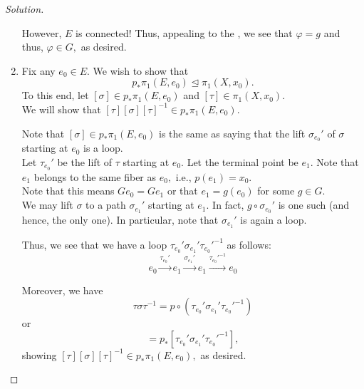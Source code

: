 \documentclass[12pt]{article}
\theoremstyle{definition}
\numberwithin{thm}{section}
\newenvironment{soln}{\begin{proof}[Solution]}{\end{proof}}
\begin{document}
\begin{soln}
\begin{enumerate}
		\begin{center}
		\end{center}

		However, $E$ is connected! Thus, appealing to the , we see that $\varphi = g$ and thus, $\varphi \in G,$ as desired.
		\item Fix any $e_0 \in E.$ We wish to show that
		\begin{equation*} 
			p_*\pi_1(E, e_0) \unlhd \pi_1(X, x_0).
		\end{equation*}
		To this end, let $[\sigma] \in p_*\pi_1(E, e_0)$ and $[\tau] \in \pi_1(X, x_0).$\\
		We will show that $[\tau][\sigma][\tau]^{-1} \in p_*\pi_1(E, e_0).$

		Note that $[\sigma] \in p_*\pi_1(E, e_0)$ is the same as saying that the lift $\sigma_{e_0}'$ of $\sigma$ starting at $e_0$ is a loop.\\
		Let $\tau_{e_0}'$ be the lift of $\tau$ starting at $e_0.$ Let the terminal point be $e_1.$ Note that $e_1$ belongs to the same fiber as $e_0,$ i.e., $p(e_1) = x_0.$ \\
		Note that this means $Ge_0 = Ge_1$ or that $e_1 = g(e_0)$ for some $g \in G.$\\
		We may lift $\sigma$ to a path $\sigma_{e_1}'$ starting at $e_1.$ In fact, $g\circ\sigma_{e_0}'$ is one such (and hence, the only one). In particular, note that $\sigma_{e_1}'$ is again a loop. 

		Thus, we see that we have a loop $\tau_{e_0}'\sigma_{e_1}'\tau_{e_0}'^{-1}$ as follows:
		\begin{equation*} 
			e_0 \overset{\tau_{e_0}'}{\longrightarrow} e_1 \overset{\sigma_{e_1}'}{\longrightarrow} e_1 \overset{\tau_{e_0}'^{-1}}{\longrightarrow} e_0
		\end{equation*}

		Moreover, we have
		\begin{equation*} 
			\tau\sigma\tau^{-1} = p\circ(\tau_{e_0}'\sigma_{e_1}'\tau_{e_0}'^{-1})
		\end{equation*}
		or
		\begin{equation*} 
			[\tau\sigma\tau^{-1}] = p_*[\tau_{e_0}'\sigma_{e_1}'\tau_{e_0}'^{-1}],
		\end{equation*}
		showing $[\tau][\sigma][\tau]^{-1} \in p_*\pi_1(E, e_0),$ as desired. \qedhere
	\end{enumerate}
\end{soln}
\end{document}
